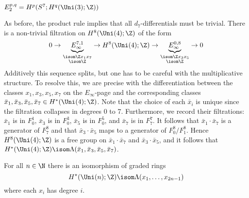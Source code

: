 \begin{example}
\begin{center}
 \\
		$E_2^{p, q} = H^p(S^7; H^q(\Uni(3); \Z))$
	\end{center}
	As before, the product rule implies that all $d_7$-differentials must be trivial.
	There is a non-trivial filtration on $H^8(\Uni(4); \Z)$ of the form
	\begin{equation*}
		0 \to \underbrace{E_\infty^{7, 1}}_{\substack{\isom \Z x_1 x_7 \\ \isom \Z}} \to H^8(\Uni(4); \Z) \to \underbrace{E_\infty^{0, 8}}_{\substack{\isom \Z x_3 x_5 \\ \isom \Z}} \to 0
	\end{equation*}
	Additively this sequence splits, but one has to be careful with the multiplicative structure.
	To resolve this, we are precise with the differentiation between the classes $x_1, x_3, x_5, x_7$ on the $E_\infty$-page and the corresponding classes $\bar{x}_1, \bar{x}_3, \bar{x}_5, \bar{x}_7 \in H^*(\Uni(4); \Z)$.
	Note that the choice of each $\bar{x}_i$ is unique since the filtration collapses in degrees 0 to 7.
	Furthermore, we record their filtrations: $\bar{x}_1$ is in $F^1_0$, $\bar{x}_3$ is in $F^3_0$, $\bar{x}_5$ is in $F^5_0$, and $\bar{x}_7$ is in $F^7_7$.
	It follows that $\bar{x}_1 \cdot \bar{x}_7$ is a generator of $F^8_7$ and that $\bar{x}_3 \cdot \bar{x}_5$ maps to a generator of $F^8_0 / F^8_1$.
	Hence $H^8(\Uni(4); \Z)$ is a free group on $\bar{x}_1 \cdot \bar{x}_7$ and $\bar{x}_3 \cdot \bar{x}_5$, and it follows that $H^*(\Uni(4); \Z) \isom \Lambda(\bar{x}_1, \bar{x}_3, \bar{x}_5, \bar{x}_7)$.
\end{example}
\begin{theorem}
	For all $n \in \N$ there is an isomorphism of graded rings
	\begin{equation*}
		H^*(\Uni(n); \Z) \isom \Lambda(x_1, \ldots, x_{2n - 1})
	\end{equation*}
	where each $x_i$ has degree $i$.
\end{theorem}
